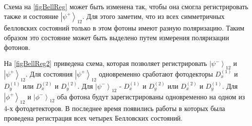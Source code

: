 

Схема на \autoref{figBellReg} может быть изменена так, чтобы она
смогла регистрировать также и состояние
$\left|\psi^{+}\right>_{12}$. Для этого заметим, что из всех
симметричных белловских состояний только в этом фотоны имеют разную
поляризацию. Таким образом это состояние может быть выделено путем
измерения поляризации фотонов.

На \autoref{figBellReg2} приведена схема, которая позволяет
регистрировать $\left|\psi^{-}\right>_{12}$ и
$\left|\psi^{+}\right>_{12}$. Для состояния
$\left|\psi^{+}\right>_{12}$ одновременно сработают фотодекторы 
$D^{(1)}_x$ и $D^{(1)}_y$ или $D^{(2)}_x$ и $D^{(2)}_y$. Для
$\left|\psi^{-}\right>_{12}$ - $D^{(1)}_x$ и $D^{(2)}_y$ или
$D^{(2)}_x$ и $D^{(1)}_y$. Для $\left|\phi^{+}\right>_{12}$ и
$\left|\phi^{-}\right>_{12}$ оба фотона будут зарегистрированы
одновременно на одном из 4-х фотодетекторов. В последнее время
появились работы \cite{bKulik} в которых была проведена регистрация
всех четырех Белловских состояний.
